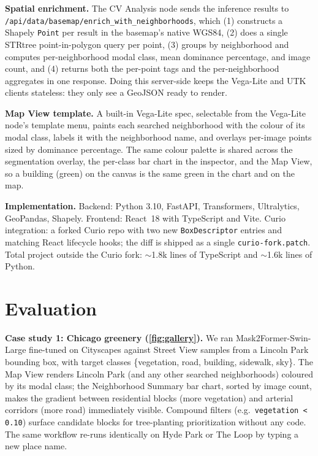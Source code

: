 \documentclass[journal]{vgtc}                     %
\begin{document}
\textbf{Spatial enrichment.} The CV Analysis node sends the inference results to \texttt{/api/data/basemap/enrich\_with\_neighborhoods}, which (1) constructs a Shapely \texttt{Point} per result in the basemap's native WGS84, (2) does a single STRtree point-in-polygon query per point, (3) groups by neighborhood and computes per-neighborhood modal class, mean dominance percentage, and image count, and (4) returns both the per-point tags and the per-neighborhood aggregates in one response. Doing this server-side keeps the Vega-Lite and UTK clients stateless: they only see a GeoJSON ready to render.

\textbf{Map View template.} A built-in Vega-Lite spec, selectable from the Vega-Lite node's template menu, paints each searched neighborhood with the colour of its modal class, labels it with the neighborhood name, and overlays per-image points sized by dominance percentage. The same colour palette is shared across the segmentation overlay, the per-class bar chart in the inspector, and the Map View, so a building (green) on the canvas is the same green in the chart and on the map.

\textbf{Implementation.} Backend: Python 3.10, FastAPI, Transformers, Ultralytics, GeoPandas, Shapely. Frontend: React~18 with TypeScript and Vite. Curio integration: a forked Curio repo with two new \texttt{BoxDescriptor} entries and matching React lifecycle hooks; the diff is shipped as a single \texttt{curio-fork.patch}. Total project outside the Curio fork: $\sim$1.8k lines of TypeScript and $\sim$1.6k lines of Python.

\section{Evaluation}
\label{sec:eval}

\textbf{Case study 1: Chicago greenery (\autoref{fig:gallery}).} We ran Mask2Former-Swin-Large fine-tuned on Cityscapes against Street View samples from a Lincoln Park bounding box, with target classes \{vegetation, road, building, sidewalk, sky\}. The Map View renders Lincoln Park (and any other searched neighborhoods) coloured by its modal class; the Neighborhood Summary bar chart, sorted by image count, makes the gradient between residential blocks (more vegetation) and arterial corridors (more road) immediately visible. Compound filters (e.g.~\texttt{vegetation < 0.10}) surface candidate blocks for tree-planting prioritization without any code. The same workflow re-runs identically on Hyde Park or The Loop by typing a new place name.
\end{document}
